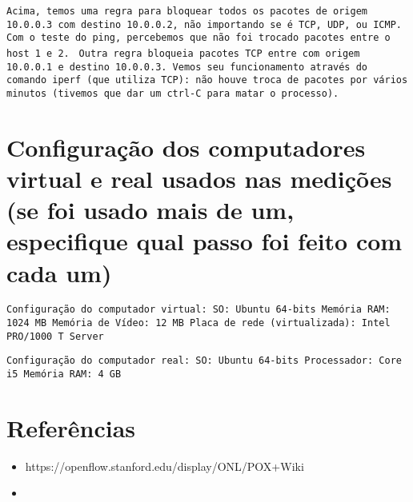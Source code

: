 \documentclass[12pt,letterpaper]{article}
\begin{document}
\texttt{Acima, temos uma regra para bloquear todos os pacotes de origem 10.0.0.3 com destino 10.0.0.2, não importando se é TCP, UDP, ou ICMP. Com o teste do ping, percebemos que não foi trocado pacotes entre o host 1 e 2. }
\newline\newline
\texttt{Outra regra bloqueia pacotes TCP entre com origem 10.0.0.1 e destino 10.0.0.3. Vemos seu funcionamento através do comando iperf (que utiliza TCP): não houve troca de pacotes por vários minutos (tivemos que dar um ctrl-C para matar o processo).}





\section{Configuração dos computadores virtual e real usados nas
medições (se foi usado mais de um, especifique qual passo foi feito
com cada um)}

\texttt{Configuração do computador virtual: \newline
SO: Ubuntu 64-bits \newline
Memória RAM: 1024 MB \newline
Memória de Vídeo: 12 MB \newline
Placa de rede (virtualizada): Intel PRO/1000 T Server 
}
\newline \newline

\texttt{Configuração do computador real: \newline
SO: Ubuntu 64-bits \newline
Processador: Core i5 \newline
Memória RAM: 4 GB
}

\section{Referências}

\begin{itemize}
   \item https://openflow.stanford.edu/display/ONL/POX+Wiki
   \item
\end{itemize}
\end{document}
